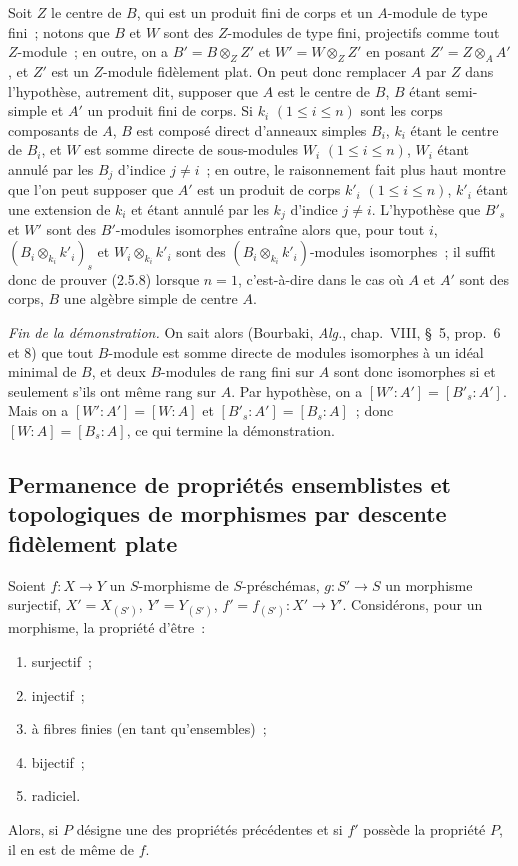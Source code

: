 \begin{env}[2.5.8.8]
Soit $Z$ le centre de $B$, qui est un produit fini de corps et un $A$-module
de type fini~; notons que $B$ et $W$ sont des $Z$-modules de type fini,
projectifs comme tout $Z$-module~; en outre, on a
$B'=B\otimes_Z Z'$ et $W'=W\otimes_Z Z'$ en posant
$Z'=Z\otimes_A A'$, et $Z'$ est un $Z$-module fidèlement plat. On peut donc
remplacer $A$ par $Z$ dans l'hypothèse, autrement dit, supposer que $A$ est
le centre de $B$, $B$ étant semi-simple et $A'$ un produit fini de corps. Si
$k_i$ $(1\leq i\leq n)$ sont les corps composants de $A$, $B$ est composé
direct d'anneaux simples $B_i$, $k_i$ étant le centre de $B_i$, et $W$ est
somme directe de sous-modules $W_i$ $(1\leq i\leq n)$, $W_i$ étant annulé
par les $B_j$ d'indice $j\ne i$~; en outre, le raisonnement fait plus haut
montre que l'on peut supposer que $A'$ est un produit de corps $k'_i$
$(1\leq i\leq n)$, $k'_i$ étant une extension de $k_i$ et étant annulé par
les $k_j$ d'indice $j\ne i$. L'hypothèse que $B'_s$ et $W'$ sont des
$B'$-modules isomorphes entraîne alors que, pour
tout $i$,
$(B_i\otimes_{k_i}k'_i)_s$ et $W_i\otimes_{k_i}k'_i$ sont des
$(B_i\otimes_{k_i}k'_i)$-modules isomorphes~; il suffit donc de prouver
(2.5.8) lorsque $n=1$, c'est-à-dire dans le cas où $A$ et $A'$ sont des
corps, $B$ une algèbre simple de centre $A$.
\end{env}

\begin{env}[2.5.8.9]
\label{IV.2.5.8.9-fr}
\emph{Fin de la démonstration.} On sait alors (Bourbaki, \emph{Alg.},
chap.~VIII, \S~5, prop.~6 et 8) que tout $B$-module est somme directe de
modules isomorphes à un idéal minimal de $B$, et deux $B$-modules de rang
fini sur $A$ sont donc isomorphes si et seulement s'ils ont même rang sur
$A$. Par hypothèse, on a $[W':A']=[B'_s:A']$. Mais on a
$[W':A']=[W:A]$ et $[B'_s:A']=[B_s:A]$~; donc $[W:A]=[B_s:A]$, ce qui
termine la démonstration.
\end{env}

\subsection{Permanence de propriétés ensemblistes et topologiques de morphismes
par descente fidèlement plate}
\label{subsection:IV.2.6-fr}

\begin{proposition}[2.6.1]
\label{IV.2.6.1-fr}
Soient $f:X\to Y$ un $S$-morphisme de $S$-préschémas, $g:S'\to S$ un
morphisme surjectif, $X'=X_{(S')}$, $Y'=Y_{(S')}$,
$f'=f_{(S')}:X'\to Y'$. Considérons, pour un morphisme, la propriété d'être~:
\begin{enumerate}
\item[(i)] surjectif~;
\item[(ii)] injectif~;
\item[(iii)] à fibres finies (en tant qu'ensembles)~;
\item[(iv)] bijectif~;
\item[(v)] radiciel.
\end{enumerate}
Alors, si $P$ désigne une des propriétés précédentes et si $f'$ possède la
propriété $P$, il en est de même de $f$.
\end{proposition}

